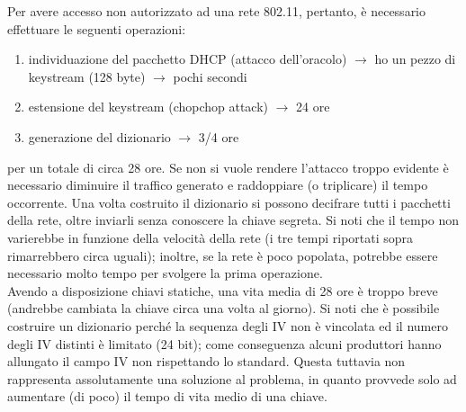 Per avere accesso non autorizzato ad una rete 802.11, pertanto, è necessario effettuare le seguenti operazioni:
\begin{enumerate}
	\item individuazione del pacchetto DHCP (attacco dell'oracolo) $\longrightarrow$ ho un pezzo di keystream (128 byte) $\longrightarrow$ pochi secondi
	\item estensione del keystream (chopchop attack) $\longrightarrow$ 24 ore
	\item generazione del dizionario $\longrightarrow$ 3/4 ore
\end{enumerate}
per un totale di circa 28 ore. Se non si vuole rendere l'attacco troppo evidente è necessario diminuire il traffico generato e raddoppiare (o triplicare) il tempo occorrente. Una volta costruito il dizionario si possono decifrare tutti i
pacchetti della rete, oltre inviarli senza conoscere la chiave segreta. Si noti che il tempo non varierebbe in funzione della velocità della rete (i tre tempi riportati sopra rimarrebbero circa uguali); inoltre, se la rete è poco popolata, potrebbe essere necessario molto tempo per svolgere la prima operazione.\\
Avendo a disposizione chiavi statiche, una vita media di 28 ore è troppo breve (andrebbe cambiata la chiave circa una volta al giorno). Si noti che è possibile costruire un dizionario perché la sequenza degli IV non è vincolata ed il numero degli IV distinti è limitato (24 bit); come conseguenza alcuni produttori hanno allungato il campo IV non rispettando lo standard. Questa tuttavia non rappresenta assolutamente una soluzione al problema, in quanto provvede solo ad aumentare (di poco) il tempo di vita medio di una chiave.\\


